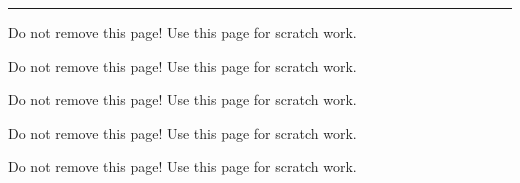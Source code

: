 \documentclass[12pt,addpoints]{exam}
\begin{document}
\begin{center}
    \pointtable[v][questions]
\end{center}

\noindent
\rule[2ex]{\textwidth}{2pt}
\clearpage


\clearpage
\begin{questions}
% 
% 
% 

\clearpage

\clearpage

\clearpage

\clearpage

\clearpage

\clearpage

\clearpage

\clearpage

\clearpage

\clearpage
\end{questions}

\clearpage
\begin{center}
Do not remove this page! Use this page for scratch work.
\end{center}
\clearpage
\begin{center}
Do not remove this page! Use this page for scratch work.
\end{center}
\clearpage
\begin{center}
Do not remove this page! Use this page for scratch work.
\end{center}
\clearpage
\begin{center}
Do not remove this page! Use this page for scratch work.
\end{center}
\clearpage
\begin{center}
Do not remove this page! Use this page for scratch work.
\end{center}
\end{document}
